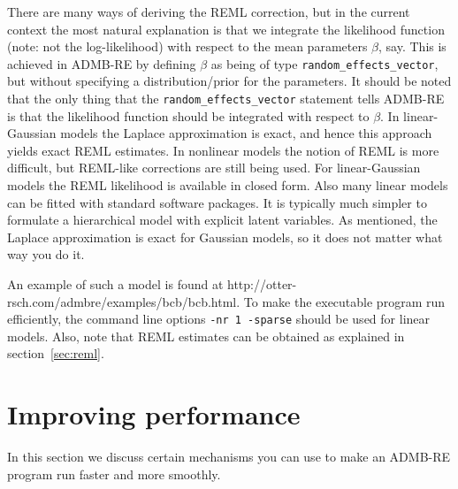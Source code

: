 \documentclass[12pt,letter,reqno]{book}
\begin{document}
There are many ways of deriving the REML correction, but in the current context the most natural explanation is that
we integrate the likelihood function (note: not the log-likelihood) with respect to the mean parameters $\beta$, say. This is
achieved in ADMB-RE by defining $\beta$ as being of type \texttt{random\_effects\_vector}, but without
specifying a distribution/prior for the parameters. It should be noted that the only thing that
the \texttt{random\_effects\_vector} statement tells ADMB-RE is that the likelihood function should be integrated with respect
to $\beta$. In linear-Gaussian models the Laplace approximation is exact, and hence this approach yields exact
REML estimates. In nonlinear models the notion of REML is more difficult, but REML-like corrections are still being used.
For linear-Gaussian models the REML likelihood is available in closed form. Also many linear models can
be fitted with standard software packages. It is typically much simpler
to formulate a hierarchical model with explicit latent variables. 
As mentioned, the Laplace approximation is exact for Gaussian models, so it does not matter
what way you do it.


An example of such a model is found at
http://otter-rsch.com/admbre/examples/bcb/bcb.html.
To make the executable program run efficiently, the command line
options \texttt{-nr 1 -sparse}  should be used for linear models.
Also, note that REML estimates can be obtained as explained in section~\ref{sec:reml}.


\section{Improving performance~\label{sec:improving}}

In this section we discuss certain mechanisms you can use to make an ADMB-RE
program run faster and more smoothly.
\end{document}
